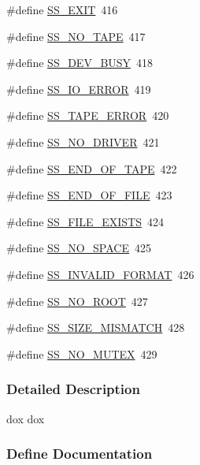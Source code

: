 \begin{DoxyCompactItemize}
\item 
\#define \hyperlink{group__err24_ga8bdfd6ab89f9628d57174f8a4287bf9f}{SS\_\-EXIT}~416
\item 
\#define \hyperlink{group__err24_ga9ac796b5448c9009c8135524ab4ede4e}{SS\_\-NO\_\-TAPE}~417
\item 
\#define \hyperlink{group__err24_gab33c355e9ba39a4bc024efc9c3bfdbbe}{SS\_\-DEV\_\-BUSY}~418
\item 
\#define \hyperlink{group__err24_gaba97d9c5175be9b9573f28e2bec7ec9c}{SS\_\-IO\_\-ERROR}~419
\item 
\#define \hyperlink{group__err24_ga1271b2092f57a1f2eab374deb5aa20e0}{SS\_\-TAPE\_\-ERROR}~420
\item 
\#define \hyperlink{group__err24_ga6d231194f11fe80cf351cab940212ead}{SS\_\-NO\_\-DRIVER}~421
\item 
\#define \hyperlink{group__err24_ga91cc51ebf0822e08c4935a2c09a1a60c}{SS\_\-END\_\-OF\_\-TAPE}~422
\item 
\#define \hyperlink{group__err24_ga040a5d277934aea616a26f523711a803}{SS\_\-END\_\-OF\_\-FILE}~423
\item 
\#define \hyperlink{group__err24_ga252be9bba4cc9d08025559dc495aca6b}{SS\_\-FILE\_\-EXISTS}~424
\item 
\#define \hyperlink{group__err24_gafe95d7246d004e42c34c3ede15d44648}{SS\_\-NO\_\-SPACE}~425
\item 
\#define \hyperlink{group__err24_gaa473d6d45ff06e93dcab855be5170ab1}{SS\_\-INVALID\_\-FORMAT}~426
\item 
\#define \hyperlink{group__err24_gabda878278e2d9236d3b18c1711c4df86}{SS\_\-NO\_\-ROOT}~427
\item 
\#define \hyperlink{group__err24_ga5fb7e0f4f8012a34514c319989e50143}{SS\_\-SIZE\_\-MISMATCH}~428
\item 
\#define \hyperlink{group__err24_ga12b0dd329283f2b865476ce4d3e1fcb3}{SS\_\-NO\_\-MUTEX}~429
\end{DoxyCompactItemize}


\subsubsection{Detailed Description}
dox dox 

\subsubsection{Define Documentation}
